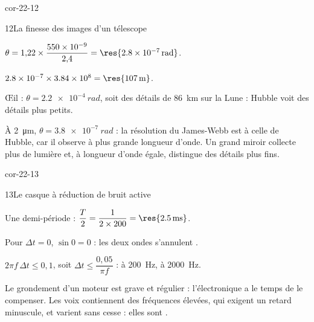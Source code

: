 \begin{blocLivre}{cor-22-12}
\begin{corrige}{12}{La finesse des images d'un télescope}
\begin{questions}
\item $\theta=1{,}22\times\dfrac{\num{550e-9}}{2{,}4}=\res{\qty{2,8e-7}{rad}}$.
\item $\num{2.8e-7}\times\num{3.84e8}=\res{\qty{107}{m}}$.
\item Œil : $\theta=\qty{2,2e-4}{rad}$, soit des détails de \qty{86}{km} sur la Lune : Hubble voit des détails 
plus petits.
\item À \qty{2}{\micro m}, $\theta=\qty{3,8e-7}{rad}$ : la résolution du James-Webb est  à celle de Hubble, car il
observe à plus grande longueur d'onde. Un grand miroir collecte plus de lumière et, à longueur d'onde égale, distingue
des détails plus fins.
\end{questions}
\end{corrige}
\end{blocLivre}
\begin{blocLivre}{cor-22-13}
\begin{corrige}{13}{Le casque à réduction de bruit active}
\begin{questions}
\item Une demi-période : $\dfrac{T}{2}=\dfrac{1}{2\times200}=\res{\qty{2,5}{ms}}$.
\item Pour $\Delta t=0$, $\sin0=0$ : les deux ondes s'annulent .
\item $2\pi f\,\Delta t\leqslant0{,}1$, soit $\Delta t\leqslant\dfrac{0{,}05}{\pi f}$ :  à \qty{200}{Hz},
 à \qty{2000}{Hz}.
\item Le grondement d'un moteur est grave et régulier : l'électronique a le temps de le compenser. Les voix contiennent
des fréquences élevées, qui exigent un retard minuscule, et varient sans cesse : elles sont .
\end{questions}
\end{corrige}
\end{blocLivre}

